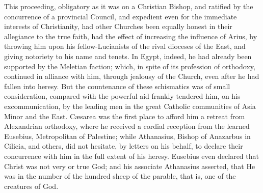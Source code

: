 This proceeding, obligatory as it was on a Christian Bishop, and
ratified by the concurrence of a provincial Council, and expedient
even for the immediate interests of Christianity, had other Churches
been equally honest in their allegiance to the true faith, had the
effect of increasing the influence of Arius, by throwing him upon his
fellow-Lucianists of the rival dioceses of the East, and giving
notoriety to his name and tenets. In Egypt, indeed, he had already
been supported by the Meletian faction; which, in spite of its
profession of orthodoxy, continued in alliance with him, through
jealousy of the Church, even after he had fallen into heresy. But the
countenance of these schismatics was of small consideration, compared
with the powerful aid frankly tendered him, on his excommunication, by
the leading men in the great Catholic communities of Asia Minor and
the East. Cæsarea was the first place to afford him a retreat from
Alexandrian orthodoxy, where he received a cordial reception from the
learned Eusebius, Metropolitan of Palestine; while Athanasius, Bishop
of Anazarbus in Cilicia, and others, did not hesitate, by letters on
his behalf, to declare their concurrence with him in the full extent
of his heresy. Eusebius even declared that Christ was not very or true
God; and his associate Athanasius asserted, that He was in the number
of the hundred sheep of the parable, that is, one of the creatures of
God.

